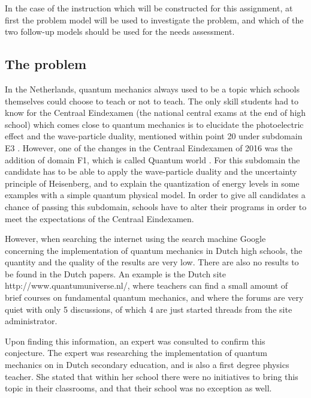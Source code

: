 \documentclass[11pt,twoside]{report} %
\begin{document}
In the case of the instruction which will be constructed for this assignment, at first the problem model will be used to investigate the problem, and which of the two follow-up models should be used for the needs assessment.

\subsection{The problem}
\label{subsec:problem}

In the Netherlands, quantum mechanics always used to be a topic which schools themselves could choose to teach or not to teach. The only skill students had to know for the Centraal Eindexamen (the national central exams at the end of high school) which comes close to quantum mechanics is to elucidate the photoelectric effect and the wave-particle duality, mentioned within point 20 under subdomain E3 \cite{eindexamen2015}. However, one of the changes in the Centraal Eindexamen of 2016 was the addition of domain F1, which is called Quantum world \cite{eindexamen2016}. For this subdomain the candidate has to be able to apply the wave-particle duality and the uncertainty principle of Heisenberg, and to explain the quantization of energy levels in some examples with a simple quantum physical model. In order to give all candidates a chance of passing this subdomain, schools have to alter their programs in order to meet the expectations of the Centraal Eindexamen.

However, when searching the internet using the search machine Google concerning the implementation of quantum mechanics in Dutch high schools, the quantity and the quality of the results are very low. There are also no results to be found in the Dutch papers. An example is the Dutch site http://www.quantumuniverse.nl/, where teachers can find a small amount of brief courses on fundamental quantum mechanics, and where the forums are very quiet with only 5 discussions, of which 4 are just started threads from the site administrator.

Upon finding this information, an expert was consulted to confirm this conjecture. The expert was researching the implementation of quantum mechanics on in Dutch secondary education, and is also a first degree physics teacher. She stated that within her school there were no initiatives to bring this topic in their classrooms, and that their school was no exception as well.
\end{document}
